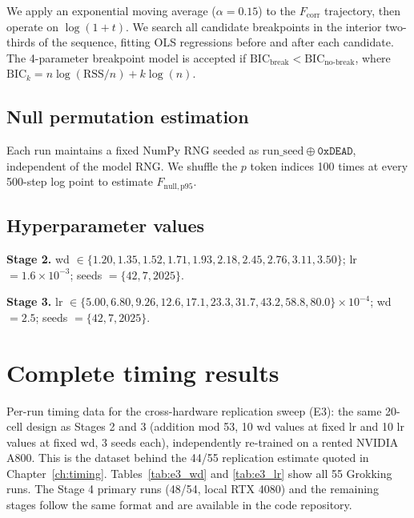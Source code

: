 \documentclass[12pt,openany,a4paper]{book}
\newcommand{\fcorr}{F_{\mathrm{corr}}}
\begin{document}
We apply an exponential moving average ($\alpha=0.15$) to the $\fcorr$ trajectory, then operate on $\log(1+t)$. We search all candidate breakpoints in the interior two-thirds of the sequence, fitting OLS regressions before and after each candidate. The 4-parameter breakpoint model is accepted if $\mathrm{BIC}_{\mathrm{break}} < \mathrm{BIC}_{\mathrm{no\text{-}break}}$, where $\mathrm{BIC}_k = n \log(\mathrm{RSS}/n) + k \log(n)$.

\section{Null permutation estimation}

Each run maintains a fixed NumPy RNG seeded as $\mathrm{run\_seed} \oplus \texttt{0xDEAD}$, independent of the model RNG. We shuffle the $p$ token indices 100 times at every 500-step log point to estimate $F_{\mathrm{null,p95}}$.

\section{Hyperparameter values}

\textbf{Stage 2.} wd $\in \{1.20, 1.35, 1.52, 1.71, 1.93, 2.18, 2.45, 2.76, 3.11, 3.50\}$; lr $= 1.6 \times 10^{-3}$; seeds $= \{42, 7, 2025\}$.

\textbf{Stage 3.} lr $\in \{5.00, 6.80, 9.26, 12.6, 17.1, 23.3, 31.7, 43.2, 58.8, 80.0\} \times 10^{-4}$; wd $= 2.5$; seeds $= \{42, 7, 2025\}$.

\chapter{Complete timing results}

Per-run timing data for the cross-hardware replication sweep (E3): the same 20-cell design as Stages 2 and 3 (addition mod 53, 10 wd values at fixed lr and 10 lr values at fixed wd, 3 seeds each), independently re-trained on a rented NVIDIA A800. This is the dataset behind the 44/55 replication estimate quoted in Chapter~\ref{ch:timing}. Tables~\ref{tab:e3_wd} and \ref{tab:e3_lr} show all 55 Grokking runs. The Stage 4 primary runs (48/54, local RTX 4080) and the remaining stages follow the same format and are available in the code repository.
\end{document}

